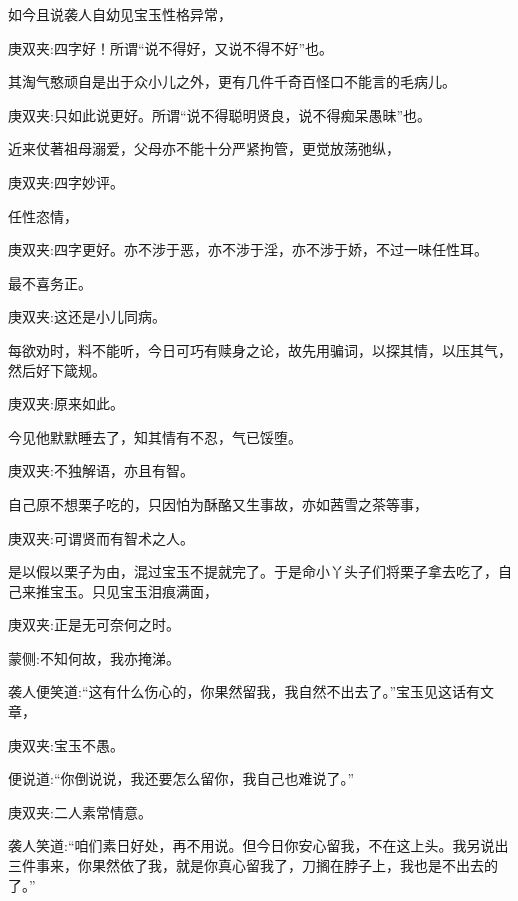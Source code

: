 \begin{parag}
    如今且说袭人自幼见宝玉性格异常，\begin{note}庚双夹:四字好！所谓“说不得好，又说不得不好”也。\end{note}其淘气憨顽自是出于众小儿之外，更有几件千奇百怪口不能言的毛病儿。\begin{note}庚双夹:只如此说更好。所谓“说不得聪明贤良，说不得痴呆愚昧”也。\end{note}近来仗著祖母溺爱，父母亦不能十分严紧拘管，更觉放荡弛纵，\begin{note}庚双夹:四字妙评。\end{note}任性恣情，\begin{note}庚双夹:四字更好。亦不涉于恶，亦不涉于淫，亦不涉于娇，不过一味任性耳。\end{note}最不喜务正。\begin{note}庚双夹:这还是小儿同病。\end{note}每欲劝时，料不能听，今日可巧有赎身之论，故先用骗词，以探其情，以压其气，然后好下箴规。\begin{note}庚双夹:原来如此。\end{note}今见他默默睡去了，知其情有不忍，气已馁堕。\begin{note}庚双夹:不独解语，亦且有智。\end{note}自己原不想栗子吃的，只因怕为酥酪又生事故，亦如茜雪之茶等事，\begin{note}庚双夹:可谓贤而有智术之人。\end{note}是以假以栗子为由，混过宝玉不提就完了。于是命小丫头子们将栗子拿去吃了，自己来推宝玉。只见宝玉泪痕满面，\begin{note}庚双夹:正是无可奈何之时。\end{note}\begin{note}蒙侧:不知何故，我亦掩涕。\end{note}袭人便笑道:“这有什么伤心的，你果然留我，我自然不出去了。”宝玉见这话有文章，\begin{note}庚双夹:宝玉不愚。\end{note}便说道:“你倒说说，我还要怎么留你，我自己也难说了。”\begin{note}庚双夹:二人素常情意。\end{note}袭人笑道:“咱们素日好处，再不用说。但今日你安心留我，不在这上头。我另说出三件事来，你果然依了我，就是你真心留我了，刀搁在脖子上，我也是不出去的了。”
\end{parag}


